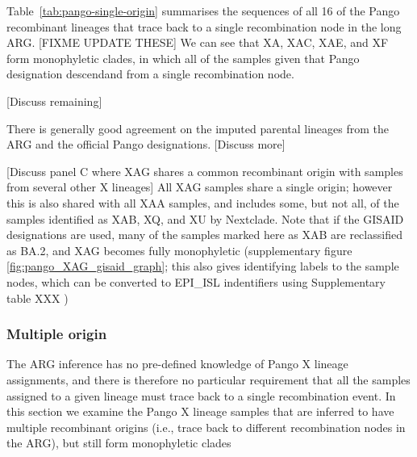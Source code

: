 \documentclass{article}
\begin{document}
Table~\ref{tab:pango-single-origin} summarises the sequences of all 16 of the
Pango recombinant lineages that trace back to a single recombination node in
the long ARG. [FIXME UPDATE THESE] We can see that XA, XAC, XAE, and XF form
monophyletic clades, in which all of the samples given that Pango designation
descendand from a single recombination node.

[Discuss remaining]

There is generally good agreement on the imputed parental lineages from the ARG
and the official Pango designations. [Discuss more]

[Discuss panel C where XAG shares a common recombinant origin with samples from
several other X lineages] All XAG samples share a single origin; however this
is also shared with all XAA samples, and includes some, but not all, of the
samples identified as XAB, XQ, and XU by Nextclade. Note that if the GISAID
designations are used, many of the samples marked here as XAB are reclassified
as BA.2, and XAG becomes fully monophyletic (supplementary figure
\ref{fig:pango_XAG_gisaid_graph}; this also gives identifying labels to the
sample nodes, which can be converted to EPI\_ISL indentifiers using
Supplementary table XXX )

\subsubsection{Multiple origin} The ARG inference has no pre-defined knowledge
of Pango X lineage assignments, and there is therefore no particular
requirement that all the samples assigned to a given lineage must trace back to
a single recombination event. In this section we examine the Pango X lineage
samples that are inferred to have multiple recombinant origins (i.e., trace
back to different recombination nodes in the ARG), but still form monophyletic
clades %
\end{document}
